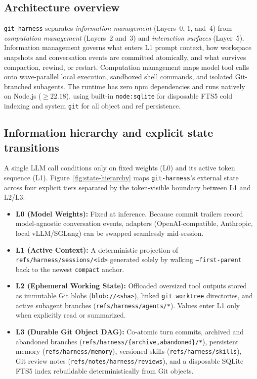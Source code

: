 \documentclass[11pt]{article}
\newcommand{\code}[1]{\nolinkurl{#1}}
\begin{document}
\subsection{Architecture overview}
\label{sec:arch-overview}
\texttt{git-harness} separates \emph{information management} (Layers~0, 1, and~4) from \emph{computation management} (Layers~2 and~3) and \emph{interaction surfaces} (Layer~5).
Information management governs what enters L1 prompt context, how workspace snapshots and conversation events are committed atomically, and what survives compaction, rewind, or restart.
Computation management maps model tool calls onto wave-parallel local execution, sandboxed shell commands, and isolated Git-branched subagents.
The runtime has zero npm dependencies and runs natively on Node.js ($\ge 22.18$), using built-in \texttt{node:sqlite} for disposable FTS5 cold indexing and system \texttt{git} for all object and ref persistence.

\subsection{Information hierarchy and explicit state transitions}
\label{sec:state-hierarchy}
A single LLM call conditions only on fixed weights (L0) and its active token sequence (L1).
Figure~\ref{fig:state-hierarchy} maps \texttt{git-harness}'s external state across four explicit tiers separated by the token-visible boundary between L1 and L2/L3:
\begin{itemize}[leftmargin=*,nosep]
  \item \textbf{L0 (Model Weights):} Fixed at inference. Because commit trailers record model-agnostic conversation events, adapters (OpenAI-compatible, Anthropic, local vLLM/SGLang) can be swapped seamlessly mid-session.
  \item \textbf{L1 (Active Context):} A deterministic projection of \code{refs/harness/sessions/<id>} generated solely by walking \texttt{--first-parent} back to the newest \texttt{compact} anchor.
  \item \textbf{L2 (Ephemeral Working State):} Offloaded oversized tool outputs stored as immutable Git blobs (\texttt{blob://<sha>}), linked \texttt{git worktree} directories, and active subagent branches (\code{refs/harness/agents/*}). Values enter L1 only when explicitly read or summarized.
  \item \textbf{L3 (Durable Git Object DAG):} Co-atomic turn commits, archived and abandoned branches (\code{refs/harness/{archive,abandoned}/*}), persistent memory (\code{refs/harness/memory}), versioned skills (\code{refs/harness/skills}), Git review notes (\code{refs/notes/harness/reviews}), and a disposable SQLite FTS5 index rebuildable deterministically from Git objects.
\end{itemize}
\end{document}
